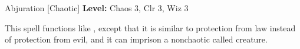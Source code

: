 {Abjuration [Chaotic]}
{
	\textbf{Level:}
	Chaos 3, Clr 3, Wiz 3\\
}
{
	This spell functions like , except that it is similar to protection from law instead of protection from evil, and it can imprison a nonchaotic called creature.

}
